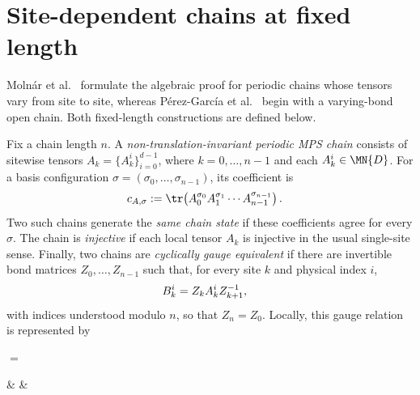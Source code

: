 \section{Site-dependent chains at fixed length}
\label{sec:non_ti_setup}

Moln\'ar et al.~\cite{Molnar2018NormalPEPS} formulate the algebraic proof for periodic chains
whose tensors vary from site to site, whereas P\'erez-Garc\'ia et al.~\cite[Theorem~3]{PerezGarcia2007Matrix}
begin with a varying-bond open chain. Both fixed-length constructions are defined below.

\begin{definition}\label{def:non_ti_chain}
    \leanok
    Fix a chain length $n$.
    A \emph{non-translation-invariant periodic MPS chain} consists of sitewise
    tensors $A_k=\{A_k^i\}_{i=0}^{d-1}$, where $k=0,\ldots,n-1$ and each
    $A_k^i\in\MN{D}$.
    For a basis configuration
    $\sigma=(\sigma_0,\ldots,\sigma_{n-1})$, its coefficient is
    \begin{align}
        c_{A,\sigma}
         & :=\tr\!\left(A_0^{\sigma_0}A_1^{\sigma_1}\cdots A_{n-1}^{\sigma_{n-1}}\right).
        \notag
    \end{align}
    Two such chains generate the \emph{same chain state} if these coefficients
    agree for every $\sigma$.
    The chain is \emph{injective} if each local tensor $A_k$ is injective in
    the usual single-site sense.
    Finally, two chains are \emph{cyclically gauge equivalent} if there are
    invertible bond matrices $Z_0,\ldots,Z_{n-1}$ such that, for every site
    $k$ and physical index $i$,
    \begin{align}
        B_k^i
         & =Z_kA_k^iZ_{k+1}^{-1},
        \notag
    \end{align}
    with indices understood modulo $n$, so that $Z_n=Z_0$. Locally, this
    gauge relation is represented by
    \begin{center}
        \tenkzkernel
        \begin{tenkz}[cols=1, west=open, east=open]
        \end{tenkz}
        $ = $
        \begin{tenkz}[west=open, east=open]
             &  & 
        \end{tenkz}
    \end{center}
\end{definition}

